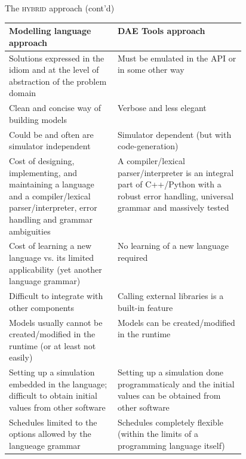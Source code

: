 \documentclass[compress,newPxFont,sthlmFooter]{beamer}
\begin{document}
\begin{frame}[plain]{The \textsc{hybrid} approach (cont'd)}
\tiny
{
\begin{table}
  \begin{tabularx}{\linewidth}{p{0.46\linewidth}X}
    \toprule
    \textcolor{sthlmRed}{\textbf{Modelling language approach}} & \textcolor{sthlmRed}{\textbf{DAE Tools approach}} \tabularnewline
    \midrule
    
    \cellcolor{light_green}Solutions expressed in the idiom and at the level of abstraction of the problem domain
      &
    \cellcolor{light_red}Must be emulated in the API or in some other way 
    \tabularnewline \midrule
    
    \cellcolor{light_green}Clean and concise way of building models
      &
    \cellcolor{light_red}Verbose and less elegant
    \tabularnewline \midrule
    
    \cellcolor{light_green}Could be and often are simulator independent
      &
    \cellcolor{light_red}Simulator dependent (but with code-generation) 
    \tabularnewline \midrule
    
    \cellcolor{light_red}Cost of designing, implementing, and maintaining a language and 
    a compiler/lexical parser/interpreter, error handling and grammar ambiguities
      &
    \cellcolor{light_green}A compiler/lexical parser/interpreter is an integral part of C++/Python with a
    robust error handling, universal grammar and massively tested 
    \tabularnewline \midrule
    
    \cellcolor{light_red}Cost of learning a new language vs. its limited applicability (yet another language grammar)
      &
    \cellcolor{light_green}No learning of a new language required
    \tabularnewline \midrule
    
    \cellcolor{light_red}Difficult to integrate with other components
      &
    \cellcolor{light_green}Calling external libraries is a built-in feature 
    \tabularnewline \midrule
    
    \cellcolor{light_red}Models usually cannot be created/modified in the runtime (or at least not easily)
      &
    \cellcolor{light_green}Models can be created/modified in the runtime 
    \tabularnewline \midrule
    
    \cellcolor{light_red}Setting up a simulation embedded in the language; difficult to obtain initial values from other software
      &
    \cellcolor{light_green}Setting up a simulation done programmaticaly and the initial values can be obtained from other software
    \tabularnewline \midrule
    
    \cellcolor{light_red}Schedules limited to the options allowed by the langueage grammar
      &
    \cellcolor{light_green}Schedules completely flexible (within the limits of a programming language itself)
    \tabularnewline
    
    \bottomrule
  \end{tabularx}
\end{table}
}
\end{frame}
\end{document}

